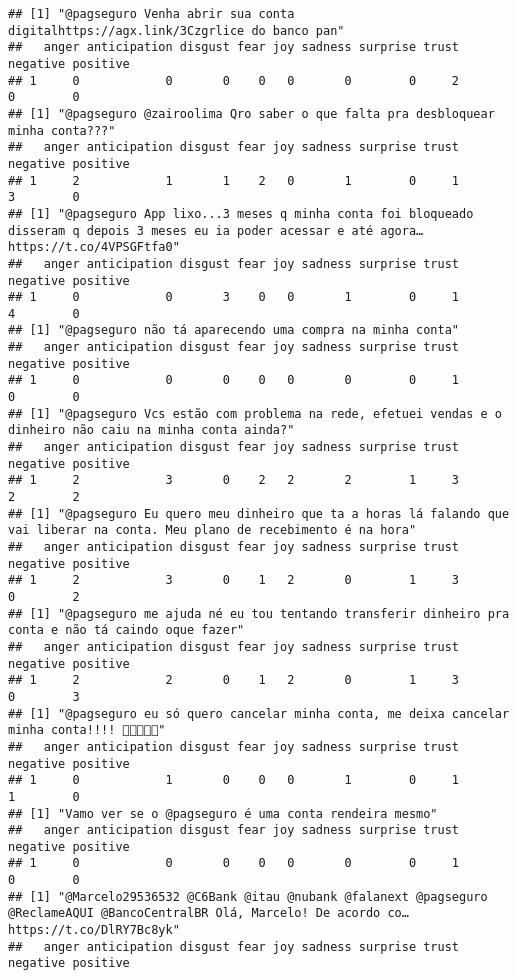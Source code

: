 \documentclass[
]{article}
\begin{document}
\begin{verbatim}
## [1] "@pagseguro Venha abrir sua conta digitalhttps://agx.link/3Czgrlice do banco pan"
##   anger anticipation disgust fear joy sadness surprise trust negative positive
## 1     0            0       0    0   0       0        0     2        0        0
## [1] "@pagseguro @zairoolima Qro saber o que falta pra desbloquear minha conta???"
##   anger anticipation disgust fear joy sadness surprise trust negative positive
## 1     2            1       1    2   0       1        0     1        3        0
## [1] "@pagseguro App lixo...3 meses q minha conta foi bloqueado disseram q depois 3 meses eu ia poder acessar e até agora… https://t.co/4VPSGFtfa0"
##   anger anticipation disgust fear joy sadness surprise trust negative positive
## 1     0            0       3    0   0       1        0     1        4        0
## [1] "@pagseguro não tá aparecendo uma compra na minha conta"
##   anger anticipation disgust fear joy sadness surprise trust negative positive
## 1     0            0       0    0   0       0        0     1        0        0
## [1] "@pagseguro Vcs estão com problema na rede, efetuei vendas e o dinheiro não caiu na minha conta ainda?"
##   anger anticipation disgust fear joy sadness surprise trust negative positive
## 1     2            3       0    2   2       2        1     3        2        2
## [1] "@pagseguro Eu quero meu dinheiro que ta a horas lá falando que vai liberar na conta. Meu plano de recebimento é na hora"
##   anger anticipation disgust fear joy sadness surprise trust negative positive
## 1     2            3       0    1   2       0        1     3        0        2
## [1] "@pagseguro me ajuda né eu tou tentando transferir dinheiro pra conta e não tá caindo oque fazer"
##   anger anticipation disgust fear joy sadness surprise trust negative positive
## 1     2            2       0    1   2       0        1     3        0        3
## [1] "@pagseguro eu só quero cancelar minha conta, me deixa cancelar minha conta!!!! 🤬🤬🤬🤬🤬"
##   anger anticipation disgust fear joy sadness surprise trust negative positive
## 1     0            1       0    0   0       1        0     1        1        0
## [1] "Vamo ver se o @pagseguro é uma conta rendeira mesmo"
##   anger anticipation disgust fear joy sadness surprise trust negative positive
## 1     0            0       0    0   0       0        0     1        0        0
## [1] "@Marcelo29536532 @C6Bank @itau @nubank @falanext @pagseguro @ReclameAQUI @BancoCentralBR Olá, Marcelo! De acordo co… https://t.co/DlRY7Bc8yk"
##   anger anticipation disgust fear joy sadness surprise trust negative positive

\end{verbatim}
\end{document}
